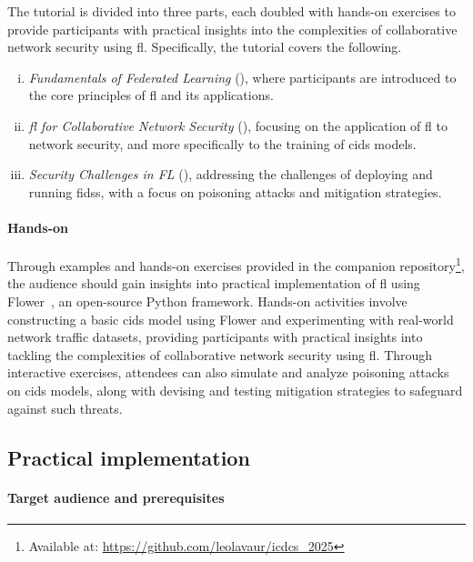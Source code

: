 \documentclass[conference]{IEEEtran}
\begin{document}
The tutorial is divided into three parts, each doubled with hands-on exercises to provide participants with practical insights into the complexities of collaborative network security using \gls{fl}.
Specifically, the tutorial covers the following.
\begin{enumerate}[(i)]
    \item \emph{Fundamentals of Federated Learning} (), where participants are introduced to the core principles of \gls{fl} and its applications.
    \item \emph{\gls{fl} for Collaborative Network Security} (), focusing on the application of \gls{fl} to network security, and more specifically to the training of \gls{cids} models.
    \item \emph{Security Challenges in FL} (), addressing the challenges of deploying and running \glspl{fids}, with a focus on poisoning attacks and mitigation strategies.
\end{enumerate}

\paragraph*{Hands-on}

Through examples and hands-on exercises provided in the companion repository\footnote{Available at: \url{https://github.com/leolavaur/icdcs_2025}}, the audience should gain insights into practical implementation of \gls{fl} using Flower~\cite{beutel_Flowerfriendlyfederated_2020}, an open-source Python framework.
Hands-on activities involve constructing a basic \gls{cids} model using Flower and experimenting with real-world network traffic datasets, providing participants with practical insights into tackling the complexities of collaborative network security using \gls{fl}.
Through interactive exercises, attendees can also simulate and analyze poisoning attacks on \gls{cids} models, along with devising and testing mitigation strategies to safeguard against such threats.

\subsection{Practical implementation}

\paragraph*{Target audience and prerequisites}
\end{document}

